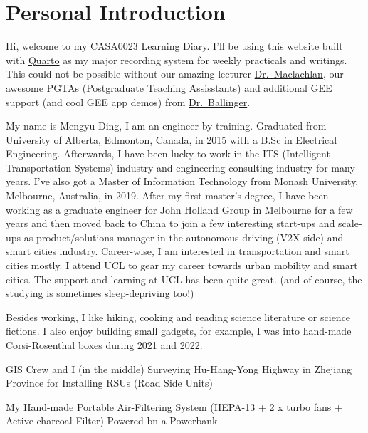 \documentclass[
  letterpaper,
  DIV=11,
  numbers=noendperiod]{scrreprt}
\begin{document}

\hypertarget{personal-introduction}{%
\chapter*{Personal Introduction}\label{personal-introduction}}


Hi, welcome to my CASA0023 Learning Diary. I'll be using this website
built with \href{https://quarto.org/}{Quarto} as my major recording
system for weekly practicals and writings. This could not be possible
without our amazing lecturer
\href{https://github.com/andrewmaclachlan}{Dr.~Maclachlan}, our awesome
PGTAs (Postgraduate Teaching Assisstants) and additional GEE support
(and cool GEE app demos) from
\href{https://oballinger.github.io/}{Dr.~Ballinger}.

My name is Mengyu Ding, I am an engineer by training. Graduated from
University of Alberta, Edmonton, Canada, in 2015 with a B.Sc in
Electrical Engineering. Afterwards, I have been lucky to work in the ITS
(Intelligent Transportation Systems) industry and engineering consulting
industry for many years. I've also got a Master of Information
Technology from Monash University, Melbourne, Australia, in 2019. After
my first master's degree, I have been working as a graduate engineer for
John Holland Group in Melbourne for a few years and then moved back to
China to join a few interesting start-ups and scale-ups as
product/solutions manager in the autonomous driving (V2X side) and smart
cities industry. Career-wise, I am interested in transportation and
smart cities mostly. I attend UCL to gear my career towards urban
mobility and smart cities. The support and learning at UCL has been
quite great. (and of course, the studying is sometimes sleep-depriving
too!)

Besides working, I like hiking, cooking and reading science literature
or science fictions. I also enjoy building small gadgets, for example, I
was into hand-made Corsi-Rosenthal boxes during 2021 and 2022.

GIS Crew and I (in the middle) Surveying Hu-Hang-Yong Highway in
Zhejiang Province for Installing RSUs (Road Side Units)

My Hand-made Portable Air-Filtering System (HEPA-13 + 2 x turbo fans +
Active charcoal Filter) Powered bn a Powerbank
\end{document}

